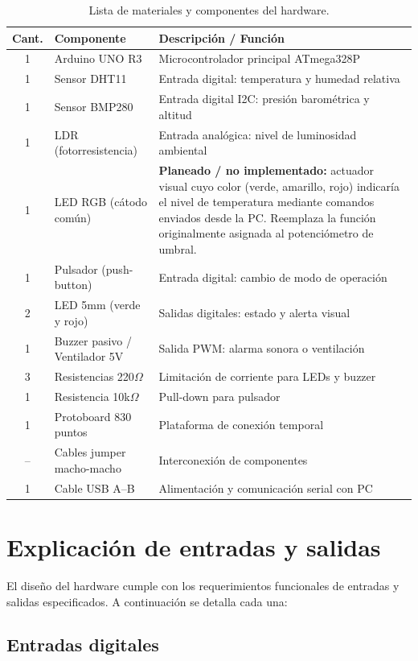 \begin{table}[H]
\centering
\caption{Lista de materiales y componentes del hardware.}
\label{tab:componentes}
\begin{tabular}{@{}clp{7cm}@{}}
\toprule
\textbf{Cant.} & \textbf{Componente} & \textbf{Descripción / Función} \\
\midrule
1 & Arduino UNO R3 & Microcontrolador principal ATmega328P \\
1 & Sensor DHT11 & Entrada digital: temperatura y humedad relativa \\
1 & Sensor BMP280 & Entrada digital I2C: presión barométrica y altitud \\
1 & LDR (fotorresistencia) & Entrada analógica: nivel de luminosidad ambiental \\
1 & LED RGB (cátodo común) & \textbf{Planeado / no implementado:} actuador visual cuyo color (verde, amarillo, rojo) indicaría el nivel de temperatura mediante comandos enviados desde la PC. Reemplaza la función originalmente asignada al potenciómetro de umbral. \\
1 & Pulsador (push-button) & Entrada digital: cambio de modo de operación \\
2 & LED 5mm (verde y rojo) & Salidas digitales: estado y alerta visual \\
1 & Buzzer pasivo / Ventilador 5V & Salida PWM: alarma sonora o ventilación \\
3 & Resistencias 220$\Omega$ & Limitación de corriente para LEDs y buzzer \\
1 & Resistencia 10k$\Omega$ & Pull-down para pulsador \\
1 & Protoboard 830 puntos & Plataforma de conexión temporal \\
-- & Cables jumper macho-macho & Interconexión de componentes \\
1 & Cable USB A--B & Alimentación y comunicación serial con PC \\
\bottomrule
\end{tabular}
\end{table}

\section{Explicación de entradas y salidas}

El diseño del hardware cumple con los requerimientos funcionales de entradas y salidas especificados. A continuación se detalla cada una:

\subsection{Entradas digitales}

